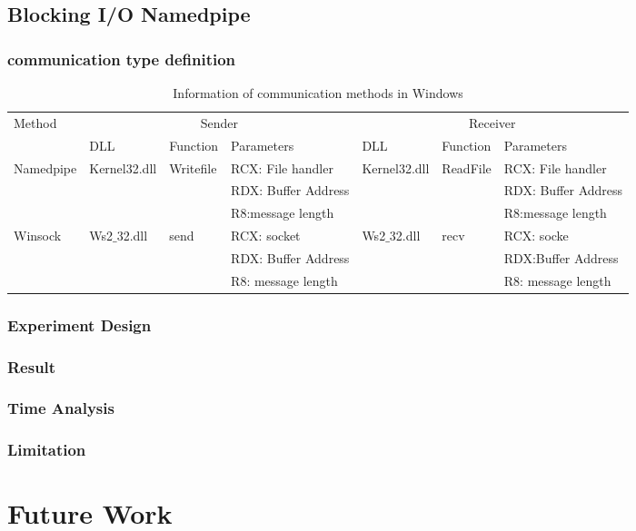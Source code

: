 \documentclass[paper=a4, fontsize=11pt]{scrartcl}
\numberwithin{equation}{section}		%
\numberwithin{figure}{section}			%
\numberwithin{table}{section}				%
\begin{document}
\subsection{Blocking I/O Namedpipe}
\subsubsection{communication type definition}
\begin{table}
        \centering
        \caption{Information of communication methods in Windows}
        \label{communicatemethod}
        \begin{tabular}{|l|l|l|l|l|l|l|}
            \hline
             \multirow{2}{*}{Method} &
               \multicolumn{3}{c|}{Sender} &
               \multicolumn{3}{c|}{Receiver} \\
             \cline{2-7}
             &  DLL & Function& Parameters & DLL  & Function & Parameters\\
             \hline
             Namedpipe& Kernel32.dll& Writefile&  RCX: File handler & Kernel32.dll & ReadFile &  RCX: File handler\\
             \cline{4-4} \cline{7-7}
             &&&RDX: Buffer Address&&&RDX: Buffer Address\\
              \cline{4-4} \cline{7-7}
               &&&R8:message length&&&R8:message length\\
               \hline
             Winsock & Ws2$\_$32.dll & send & RCX: socket & Ws2$\_$32.dll & recv & RCX: socke \\
              \cline{4-4} \cline{7-7}
             &&&RDX: Buffer Address&&&RDX:Buffer Address\\
              \cline{4-4} \cline{7-7}
               &&&R8: message length&&&R8: message length\\
            \hline
        \end{tabular}
    \end{table}
\subsubsection{Experiment Design}
\subsubsection{Result}
\subsubsection{Time Analysis}
\subsubsection{Limitation}

\section{Future Work}



 


\end{document}

